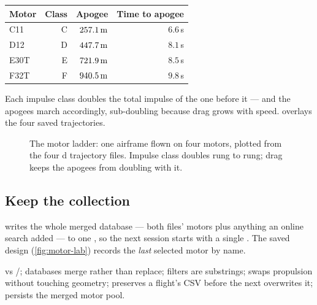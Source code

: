 \begin{center}\small
\begin{tabular}{@{}lrrr@{}}
\toprule
\textbf{Motor} & \textbf{Class} & \textbf{Apogee} & \textbf{Time to apogee}\\
\midrule
C11  & C & $257.1\,\mathrm{m}$ & $6.6$\,s\\
D12  & D & $447.7\,\mathrm{m}$ & $8.1$\,s\\
E30T & E & $721.9\,\mathrm{m}$ & $8.5$\,s\\
F32T & F & $940.5\,\mathrm{m}$ & $9.8$\,s\\
\bottomrule
\end{tabular}
\end{center}

Each impulse class doubles the total impulse of the one before it --- and the
apogees march accordingly, sub-doubling because drag grows with speed.
 overlays the four saved trajectories.

\begin{figure}[htbp]\centering
{}
\caption{The motor ladder: one airframe flown on four motors, plotted from the
four d trajectory files. Impulse class doubles rung to rung; drag
keeps the apogees from doubling with it.}
\label{fig:motor-ladder}
\end{figure}

\subsection*{Keep the collection}



 writes the whole merged database --- both files' motors plus
anything an online search added --- to one , so the next session
starts with a single . The saved design
(\cref{fig:motor-lab}) records the \emph{last} selected motor by name.


\begin{tip}
 vs /; databases merge rather than replace;
 filters are substrings;  swaps propulsion
without touching geometry;  preserves a flight's CSV before the
next  overwrites it;  persists the merged motor pool.
\end{tip}
